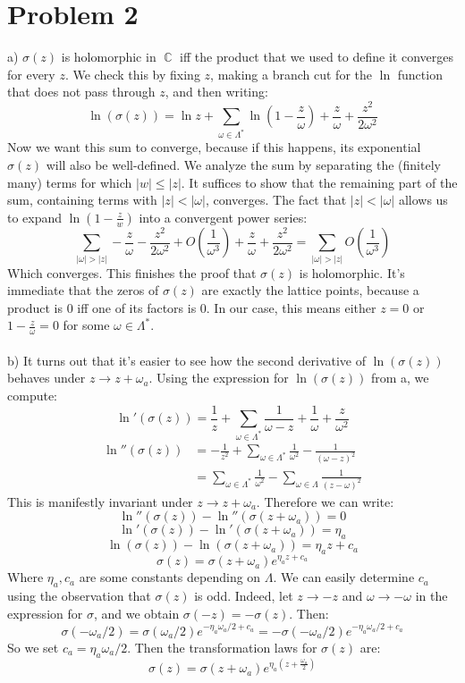 \documentclass[12 pt]{article}
\DeclareMathOperator {\C} {\mathbb{C}}
\theoremstyle{plain}
\theoremstyle{definition}
\theoremstyle{remark}
\begin{document}
\section*{Problem 2}
a) $\sigma(z)$ is holomorphic in $\C$ iff the product that we used to define it converges for every $z$. We check this by fixing $z$, making a branch cut for the $\ln$ function that does not pass through $z$, and then writing:
\[      \ln (\sigma(z)) = \ln z + \sum_{\omega \in \Lambda^*} \ln \left( 1 - \frac{z}{\omega} \right) + \frac{z}{\omega} + \frac{z^2}{2\omega^2}     \]
Now we want this sum to converge, because if this happens, its exponential $\sigma(z)$ will also be well-defined. We analyze the sum by separating the (finitely many) terms for which $|w|\leq |z|$. It suffices to show that the remaining part of the sum, containing terms with $|z|<|\omega|$, converges. The fact that $|z|<|\omega|$ allows us to expand $\ln(1 - \frac{z}{w})$ into a convergent power series:
\[       \sum_{|\omega|>|z|}  - \frac{z}{\omega} - \frac{z^2}{2\omega^2} + O\left(\frac{1}{\omega^3}\right) +  \frac{z}{\omega} + \frac{z^2}{2\omega^2}  = \sum_{|\omega|>|z|} O\left(\frac{1}{\omega^3}\right)  \]
Which converges. This finishes the proof that $\sigma(z)$ is holomorphic. It's immediate that the zeros of $\sigma(z)$ are exactly the lattice points, because a product is 0 iff one of its factors is 0. In our case, this means either $z = 0$ or $1 - \frac{z}{\omega} = 0$ for some $\omega \in \Lambda^*$.
\\
\\
b) It turns out that it's easier to see how the second derivative of $\ln (\sigma(z))$ behaves under $z \to z + \omega_a$. Using the expression for $\ln (\sigma(z))$ from a, we compute:
\[    \ln'(\sigma(z)) = \frac{1}{z} + \sum_{\omega \in \Lambda^*} \frac{1}{\omega - z} + \frac{1}{\omega} + \frac{z}{\omega^2}     \]
\begin{align*}
      \ln''(\sigma(z))  &= - \frac{1}{z^2} + \sum_{\omega \in \Lambda^*} \frac{1}{\omega^2} - \frac{1}{(\omega - z)^2}  \\
                            &=  \sum_{\omega \in \Lambda^*} \frac{1}{\omega^2} - \sum_{\omega \in \Lambda} \frac{1}{(z-\omega)^2}
\end{align*}
This is manifestly invariant under $z \to z + \omega_a$. Therefore we can write:
\[      \ln''(\sigma(z))  - \ln''(\sigma(z+ \omega_a)) = 0     \]
\[          \ln'(\sigma(z))  - \ln'(\sigma(z+ \omega_a)) = \eta_a      \]
\[        \ln(\sigma(z))  - \ln(\sigma(z+ \omega_a)) = \eta_a  z + c_a       \]
\[        \sigma(z) = \sigma(z+\omega_a) e^{\eta_a z + c_a}       \]
Where $\eta_a, c_a$ are some constants depending on $\Lambda$. We can easily determine $c_a$ using the observation that $\sigma(z)$ is odd. Indeed, let $z\to -z$ and $\omega \to -\omega$ in the expression for $\sigma$, and we obtain $\sigma(-z) = - \sigma(z)$. Then:
\[            \sigma( - \omega_a /2) = \sigma(\omega_a/2) e^{-\eta_a \omega_a/2 + c_a}   = - \sigma(-\omega_a/2) e^{-\eta_a \omega_a/2 + c_a}          \]
So we set $c_a = \eta_a \omega_a /2$. Then the transformation laws for $\sigma(z)$ are:
\[         \sigma(z) = \sigma(z+\omega_a) e^{\eta_a ( z + \frac{\omega_a}{2})}         \]
\end{document}
